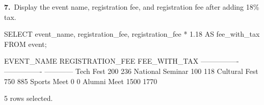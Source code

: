 \noindent\begin{minipage}{\linewidth}
\begingroup{}
{\fontsize{14}{17}\selectfont\textbf{7.}}\ Display the event name, registration fee, and registration fee after adding 18\% tax.\par
\endgroup\vspace{12pt}


\begin{sqlcode}
SELECT event_name, registration_fee,
       registration_fee * 1.18 AS fee_with_tax
FROM event;
\end{sqlcode}

\vspace{18pt}


\begin{sqlout}[fontsize=\small]
EVENT_NAME        REGISTRATION_FEE  FEE_WITH_TAX
----------------  ----------------  ------------
Tech Fest                      200           236
National Seminar               100           118
Cultural Fest                  750           885
Sports Meet                      0             0
Alumni Meet                   1500          1770

5 rows selected.
\end{sqlout}
\end{minipage}\par\vspace{24pt}

